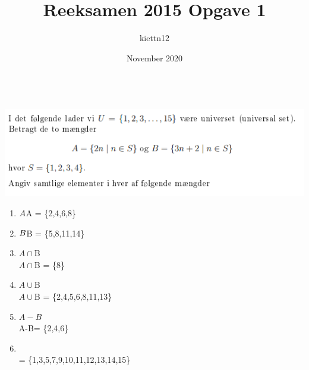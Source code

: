\documentclass{article}
\title{Reeksamen 2015}
\author{kiettn12}
\date{November 2020}
\begin{document}
\maketitle
\title{
\normalsize \normalfont
\textbf{Opgave 1}}
\\
\includegraphics[width=1.0 \textwidth]{Reeksamen.PNG}
\begin{enumerate}[label=(\Alph*)]
\item $A
\\
$A = \big\{2,4,6,8\big\}
\\

\item $B 
\\
$B = \big\{5,8,11,14\big\}
\\

\item $A \cap $B 
\\
$A \cap $B = \big\{8\big\}
\\

\item $A\cup$B 
\\
$A\cup$B = \big\{2,4,5,6,8,11,13\big\}
\\

\item $A-B$
\\
A-B= \big\{2,4,6\big\}
\\

\item {}
\\ 
 = \big\{1,3,5,7,9,10,11,12,13,14,15\big\}
\\

\end{enumerate}
\\
\end{document}
